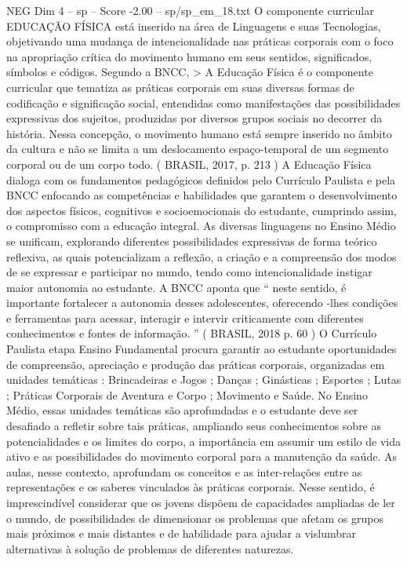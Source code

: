 \begin{textsample}{NEG Dim 4 – sp – Score -2.00 – sp/sp\_em\_18.txt}  \label{ex:f4_neg_033}
O componente curricular EDUCAÇÃO FÍSICA está inserido na área de Linguagens e suas Tecnologias, objetivando uma mudança de intencionalidade nas práticas corporais com o foco na apropriação crítica do movimento humano em seus sentidos, significados, símbolos e códigos.
Segundo a BNCC, > A Educação Física é o componente curricular que tematiza as práticas corporais em suas diversas formas de codificação e significação social, entendidas como manifestações das possibilidades expressivas dos sujeitos, produzidas por diversos grupos sociais no decorrer da história.
Nessa concepção, o movimento humano está sempre inserido no âmbito da cultura e não se limita a um deslocamento espaço-temporal de um segmento corporal ou de um corpo todo. ( BRASIL, 2017, p. 213 ) A Educação Física dialoga com os fundamentos pedagógicos definidos pelo Currículo Paulista e pela BNCC enfocando as competências e habilidades que garantem o desenvolvimento dos aspectos físicos, cognitivos e socioemocionais do estudante, cumprindo assim, o compromisso com a educação integral.
As diversas linguagens no Ensino Médio se unificam, explorando diferentes possibilidades expressivas de forma teórico reflexiva, as quais potencializam a reflexão, a criação e a compreensão dos modos de se expressar e participar no mundo, tendo como intencionalidade instigar maior autonomia ao estudante.
A BNCC aponta que “ neste sentido, é importante fortalecer a autonomia desses adolescentes, oferecendo -lhes condições e ferramentas para acessar, interagir e intervir criticamente com diferentes conhecimentos e fontes de informação. ” ( BRASIL, 2018 p. 60 ) O Currículo Paulista etapa Ensino Fundamental procura garantir ao estudante oportunidades de compreensão, apreciação e produção das práticas corporais, organizadas em unidades temáticas : Brincadeiras e Jogos ; Danças ; Ginásticas ; Esportes ; Lutas ; Práticas Corporais de Aventura e Corpo ; Movimento e Saúde.
No Ensino Médio, essas unidades temáticas são aprofundadas e o estudante deve ser desafiado a refletir sobre tais práticas, ampliando seus conhecimentos sobre as potencialidades e os limites do corpo, a importância em assumir um estilo de vida ativo e as possibilidades do movimento corporal para a manutenção da saúde.
As aulas, nesse contexto, aprofundam os conceitos e as inter-relações entre as representações e os saberes vinculados às práticas corporais.
Nesse sentido, é imprescindível considerar que os jovens dispõem de capacidades ampliadas de ler o mundo, de possibilidades de dimensionar os problemas que afetam os grupos mais próximos e mais distantes e de habilidade para ajudar a vislumbrar alternativas à solução de problemas de diferentes naturezas.

\end{textsample}
